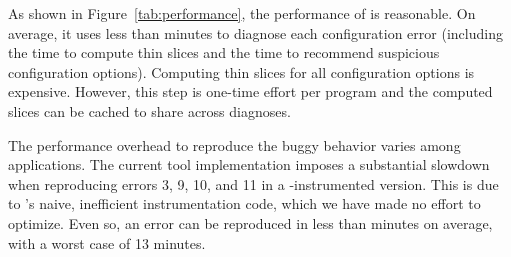 As shown in Figure~\ref{tab:performance},
the performance of \ourtool is reasonable.
On average, it uses less than \avgtime minutes to
diagnose each configuration error (including
the time to compute thin slices and the time
to recommend suspicious configuration options). Computing
thin slices for all configuration options
is expensive. However, this step is one-time effort
per program and the computed slices can be cached
to share across diagnoses. %


The performance overhead to reproduce the buggy behavior varies
among applications. The current tool implementation
imposes a substantial slowdown when reproducing
errors 3, 9, 10, and 11 in a \ourtool-instrumented version.
This is due to \ourtool's naive,
inefficient instrumentation code, which we have made no effort to optimize.
Even so, an error can be reproduced in less than \avgtime 
minutes on average, with a worst case of 13 minutes.






